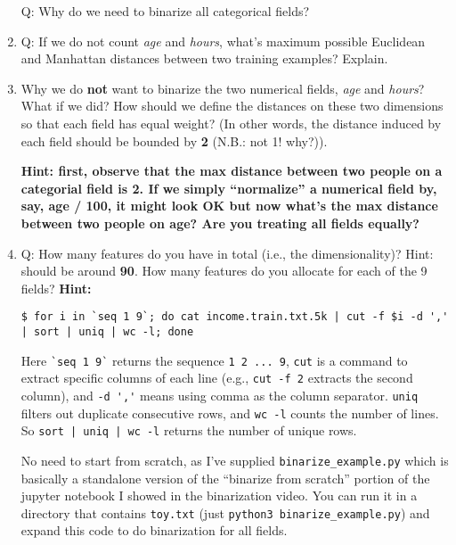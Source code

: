 \documentclass[11pt]{article}
\newcommand{\update}[1]{{\bf\color{black} #1}}
\begin{document}
\begin{enumerate}
Q: Why do we need to  binarize all categorical fields?

\item
Q: If we do not count {\it age} and {\it hours},
what's maximum possible Euclidean and Manhattan distances between two training examples? Explain.

\item
  Why we do {\bf not} want to binarize the two numerical fields, {\it age} and {\it hours}?
  What if we did?
  How should we define the distances on these two dimensions so that
  each field has equal weight? (In other words, the distance induced by
  each field should be bounded by \update{2} (N.B.: not 1! why?)).
  
  \update{Hint: first, observe that the max distance between two people on a categorial field is 2. If we simply ``normalize'' a numerical field by, say, age / 100, it might look OK but now what's the max distance between two people on age? Are you treating all fields equally?}
  
  



\item 
  Q: How many features do you have in total (i.e., the dimensionality)?
  Hint: should be around \update{90}.
  How many features do you allocate for 
  each of the 9 fields?
\update{  Hint:   }
 \color{black}
\begin{verbatim}
$ for i in `seq 1 9`; do cat income.train.txt.5k | cut -f $i -d ',' | sort | uniq | wc -l; done
\end{verbatim}
\color{black}

Here \verb|`seq 1 9`| returns the sequence \verb|1 2 ... 9|, \verb|cut| is a command to extract specific columns of each line (e.g., \verb|cut -f 2| extracts the second column), and \verb|-d ','| means using comma as the column separator. 
\verb|uniq| filters out duplicate consecutive rows, and \verb|wc -l| counts the number of lines. So \verb$sort | uniq | wc -l$ returns the number of unique rows.

 No need to start from scratch, as I've supplied \verb|binarize_example.py| which is basically a standalone version of the ``binarize from scratch'' portion
of the jupyter notebook I showed in the binarization video. You can run it in a directory that contains \verb|toy.txt| (just \verb|python3 binarize_example.py|) and expand this code to do binarization for all fields.


\end{enumerate}
\end{document}
